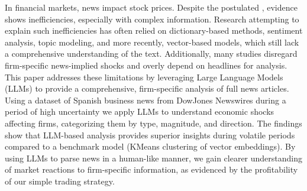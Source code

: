 In financial markets, news impact stock prices. Despite the postulated , evidence shows inefficiencies, especially with complex information. Research attempting to explain such inefficiencies has often relied on dictionary-based methods, sentiment analysis, topic modeling, and more recently, vector-based models,
which still lack a comprehensive understanding of the text. Additionally, many studies disregard firm-specific news-implied shocks and overly depend on headlines for analysis. This paper addresses these limitations by leveraging Large Language Models (LLMs) to provide a comprehensive, firm-specific analysis of full news articles. 
Using a dataset of Spanish business news from DowJones Newswires during a period of high uncertainty 
we apply LLMs to understand economic shocks affecting firms, categorizing them by type, magnitude, and direction. The findings show that LLM-based analysis provides superior insights during volatile periods compared to a benchmark model (KMeans clustering of vector embeddings). By using LLMs to parse news in a human-like manner, we gain clearer understanding of market reactions to firm-specific information, as evidenced by the profitability of our simple trading strategy.

